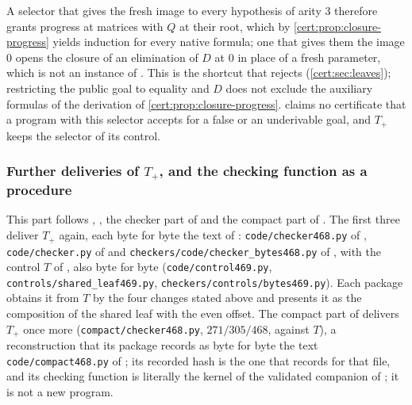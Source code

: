 A selector that gives the fresh image to every hypothesis of arity $3$ therefore
grants progress at matrices with $Q$ at their root, which by
\cref{cert:prop:closure-progress} yields induction for every native formula; one
that gives them the image $0$ opens the closure of an elimination of $D$ at $0$
in place of a fresh parameter, which is not an instance of . This is the
shortcut that  rejects (\cref{cert:sec:leaves}); restricting
the public goal to equality and $D$ does not exclude the auxiliary formulas of
the derivation of \cref{cert:prop:closure-progress}. 
claims no certificate that a program with this selector accepts for a false or an
underivable goal, and $T_{+}$ keeps the selector of its control.

\subsubsection*{Further deliveries of $T_{+}$, and the checking function as a procedure}

This part follows , , the
checker part of  and the compact part of
. The first three deliver $T_{+}$ again, each byte
for byte the text of : \texttt{code/checker468.py} of
, \texttt{code/checker.py} of 
and \texttt{checkers/code/checker\_bytes468.py} of , with
the control $T$ of , also byte for byte
(\texttt{code/control469.py}, \texttt{controls/shared\_leaf469.py},
\texttt{checkers/controls/bytes469.py}). Each package obtains it from $T$ by the
four changes stated above and presents it as the composition of the shared leaf
with the even offset. The compact part of  delivers
$T_{+}$ once more (\texttt{compact/checker468.py}, $271/305/468$, against $T$), a
reconstruction that its package records as byte for byte the text
\texttt{code/compact468.py} of ; its recorded hash is the
one that  records for that file, and its checking
function is literally the kernel of the validated companion of
; it is not a new program.

